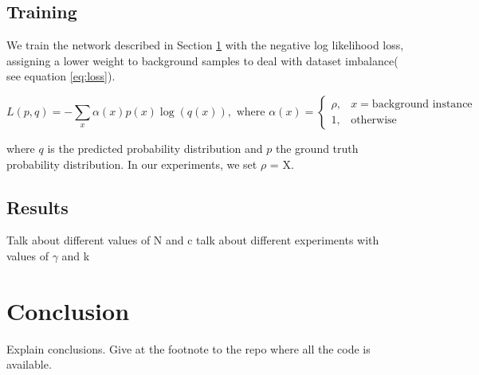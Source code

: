 \documentclass{article}
\begin{document}
\subsection{Training}
We train the network described in Section \ref{} with the negative log likelihood loss, assigning a lower weight to background samples to deal with dataset imbalance( see equation \ref{eq:loss}). 

\begin{equation}
    L(p,q) = - \sum_x \alpha(x) p(x) \log (q(x)), \text{ where } \alpha(x) =
    \begin{cases}
        \rho, & x = \text{background instance}\\
        1,    & \text{otherwise}
    \end{cases}
    \label{eq:loss}
\end{equation}


where $q$ is the predicted probability distribution and $p$ the ground truth probability distribution. In our experiments, we set $\rho$ = X. 



\subsection{Results}

Talk about different values of N and c
talk about different experiments with values of $\gamma$ and k


\section{Conclusion}

Explain conclusions. Give at the footnote to the repo where all the code is available.




\section*{}
{\small


}
\end{document}
